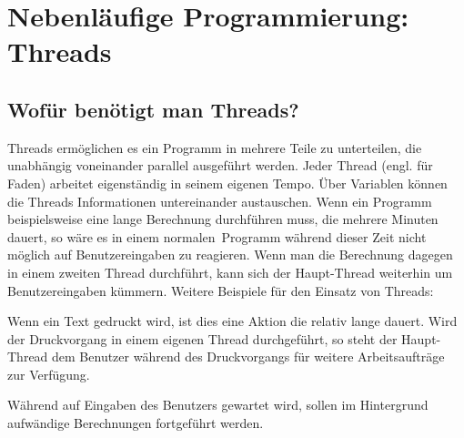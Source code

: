\chapter{Nebenläufige Programmierung: Threads}
\renewcommand{\chaptertitle}{Nebenläufige Programmierung: Threads}

\lehead[]{\normalfont\sffamily\hspace*{-2.00cm}\textcolor{white}{\colorbox{lightblue}{\makebox[1.60cm][r]{\thechapter}}}\hspace{0.17cm}\textcolor{lightblue}{\chaptertitle}}
\rohead[]{\textcolor{lightblue}{\chaptertitle}\normalfont\sffamily\hspace*{0.17cm}\textcolor{white}{\colorbox{lightblue}{\makebox[1.60cm][l]{\thechapter}}}\hspace{-2.00cm}}
\rehead[]{\textcolor{lightblue}{AvHG, Inf, My}}
\lohead[]{\textcolor{lightblue}{AvHG, Inf, My}}

\lstset{style=myJava}

\section{Wofür benötigt man Threads?}

Threads ermöglichen es ein Programm in mehrere Teile zu unterteilen, die
unabhängig voneinander parallel ausgeführt werden. Jeder Thread (engl. für
Faden) arbeitet eigenständig in seinem eigenen Tempo. Über Variablen können die
Threads Informationen untereinander austauschen. Wenn ein Programm
beispielsweise eine lange Berechnung durchführen muss, die mehrere Minuten
dauert, so wäre es in einem \glqq normalen\grqq\ Programm während dieser Zeit
nicht möglich auf Benutzereingaben zu reagieren. Wenn man die Berechnung dagegen
in einem zweiten Thread durchführt, kann sich der Haupt-Thread weiterhin um
Benutzereingaben kümmern. Weitere Beispiele für den Einsatz von Threads:

\begin{compactitem}
\item Wenn ein Text gedruckt wird, ist dies eine Aktion die relativ lange
dauert. Wird der Druckvorgang in einem eigenen Thread durchgeführt, so steht der
Haupt-Thread dem Benutzer während des Druckvorgangs für weitere Arbeitsaufträge
zur Verfügung.

\item Während auf Eingaben des Benutzers gewartet wird, sollen im Hintergrund
aufwändige Berechnungen fortgeführt werden.
\end{compactitem}

